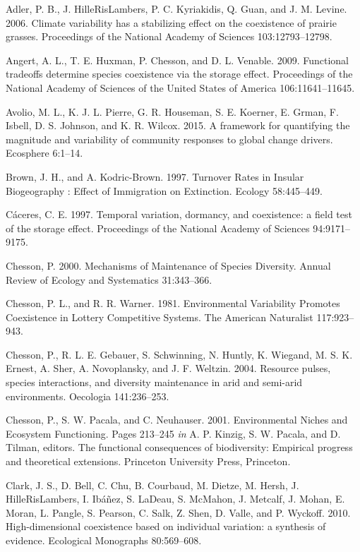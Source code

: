 \documentclass[12pt,]{article}
\begin{document}
Adler, P. B., J. HilleRisLambers, P. C. Kyriakidis, Q. Guan, and J. M.
Levine. 2006. Climate variability has a stabilizing effect on the
coexistence of prairie grasses. Proceedings of the National Academy of
Sciences 103:12793--12798.

Angert, A. L., T. E. Huxman, P. Chesson, and D. L. Venable. 2009.
Functional tradeoffs determine species coexistence via the storage
effect. Proceedings of the National Academy of Sciences of the United
States of America 106:11641--11645.

Avolio, M. L., K. J. L. Pierre, G. R. Houseman, S. E. Koerner, E. Grman,
F. Isbell, D. S. Johnson, and K. R. Wilcox. 2015. A framework for
quantifying the magnitude and variability of community responses to
global change drivers. Ecosphere 6:1--14.

Brown, J. H., and A. Kodric-Brown. 1997. Turnover Rates in Insular
Biogeography : Effect of Immigration on Extinction. Ecology 58:445--449.

C{á}ceres, C. E. 1997. Temporal variation, dormancy, and coexistence: a
field test of the storage effect. Proceedings of the National Academy of
Sciences 94:9171--9175.

Chesson, P. 2000. Mechanisms of Maintenance of Species Diversity. Annual
Review of Ecology and Systematics 31:343--366.

Chesson, P. L., and R. R. Warner. 1981. Environmental Variability
Promotes Coexistence in Lottery Competitive Systems. The American
Naturalist 117:923--943.

Chesson, P., R. L. E. Gebauer, S. Schwinning, N. Huntly, K. Wiegand, M.
S. K. Ernest, A. Sher, A. Novoplansky, and J. F. Weltzin. 2004. Resource
pulses, species interactions, and diversity maintenance in arid and
semi-arid environments. Oecologia 141:236--253.

Chesson, P., S. W. Pacala, and C. Neuhauser. 2001. Environmental Niches
and Ecosystem Functioning. Pages 213--245 \emph{in} A. P. Kinzig, S. W.
Pacala, and D. Tilman, editors. The functional consequences of
biodiversity: Empirical progress and theoretical extensions. Princeton
University Press, Princeton.

Clark, J. S., D. Bell, C. Chu, B. Courbaud, M. Dietze, M. Hersh, J.
HilleRisLambers, I. Ib{á}{ñ}ez, S. LaDeau, S. McMahon, J. Metcalf, J.
Mohan, E. Moran, L. Pangle, S. Pearson, C. Salk, Z. Shen, D. Valle, and
P. Wyckoff. 2010. High-dimensional coexistence based on individual
variation: a synthesis of evidence. Ecological Monographs 80:569--608.
\end{document}
